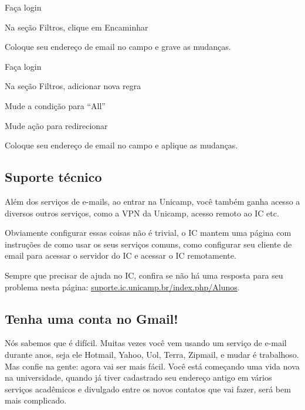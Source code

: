 \begin{compactenumerate}
    \item  {}
    \item  Faça login
    \item  Na seção Filtros, clique em Encaminhar
    \item  Coloque seu endereço de email no campo e grave as mudanças.
\end{compactenumerate}

\begin{compactenumerate}
    \item  {}
    \item  Faça login
    \item  Na seção Filtros, adicionar nova regra
    \item  Mude a condição para ``All''
    \item  Mude ação para redirecionar
    \item  Coloque seu endereço de email no campo e aplique as mudanças.
\end{compactenumerate}

\subsection{Suporte técnico}

Além dos serviços de e-mails, ao entrar na Unicamp, você também ganha acesso a
diversos outros serviços, como a VPN da Unicamp, acesso remoto ao IC etc.

Obviamente configurar essas coisas não é trivial, o IC mantem uma página com
instruções de como usar os seus serviços comuns, como configurar seu cliente de
email para acessar o servidor do IC e acessar o IC remotamente.

Sempre que precisar de ajuda no IC, confira se não há uma resposta para seu
problema nesta página: \url{suporte.ic.unicamp.br/index.php/Alunos}.


\subsection{Tenha uma conta no Gmail!}

Nós sabemos que é difícil. Muitas vezes você vem usando um serviço de e-mail
durante anos, seja ele Hotmail, Yahoo, Uol, Terra, Zipmail, e mudar é
trabalhoso.  Mas confie na gente: agora vai ser mais fácil. Você está começando
uma vida nova na universidade, quando já tiver cadastrado seu endereço antigo
em vários serviços acadêmicos e divulgado entre os novos contatos que vai
fazer, será bem mais complicado.

